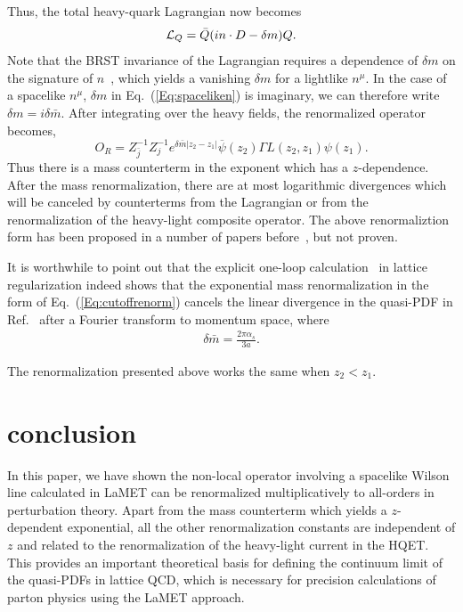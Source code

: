 \documentclass[prd,aps,twocolumn,preprintnumbers, showpacs, nofootinbib,superscriptaddress,notitlepage]{revtex4-1}
\newcommand{\beq}{\begin{eqnarray}}
\newcommand{\eeq}{\end{eqnarray}}
\begin{document}
Thus, the total heavy-quark Lagrangian now becomes
\begin{equation}\label{Eq:spaceliken}
    {\cal L}_Q = \bar Q (i n\cdot D-\delta m)Q.
\end{equation}
Note that the BRST invariance of the Lagrangian requires a dependence of $\delta m$ on the signature of $n$~\cite{Dorn:1986dt}, which yields a vanishing $\delta m$ for a lightlike $n^\mu$. In the case of a spacelike $n^\mu$, $\delta m$ in Eq.~(\ref{Eq:spaceliken}) is imaginary, we can therefore write $\delta m=i\delta {\bar m}$. After integrating over the heavy fields,  the renormalized operator becomes,
\begin{equation}\label{Eq:cutoffrenorm}
        O_R = Z_{\bar j}^{-1}Z_{j}^{-1}e^{\delta \bar m|z_2-z_1|}\overline{\psi}(z_2) \Gamma L(z_2,z_1)\psi(z_1).
\end{equation}
Thus there is a mass counterterm in the exponent which has a $z$-dependence.
After the mass renormalization, there are at most logarithmic divergences which will be canceled by counterterms from the Lagrangian or from the renormalization of the heavy-light composite operator. The above renormaliztion form has been proposed in a number of papers before~\cite{Musch:2010ka,Ishikawa:2016znu,Chen:2016fxx,Constantinou:2017sej,Alexandrou:2017huk,Chen:2017mzz},
but not proven.

It is worthwhile to point out that the explicit one-loop calculation~\cite{Chen:2016fxx} in lattice regularization indeed shows that the exponential mass renormalization in the form of Eq.~(\ref{Eq:cutoffrenorm}) cancels the linear divergence in the quasi-PDF in Ref.~\cite{Xiong:2013bka} after a Fourier transform to momentum space, where
\beq
\delta \bar m=\frac{2\pi\alpha_s }{3a}.
\eeq

The renormalization presented above works the same when $z_2<z_1$.

\section{conclusion}
In this paper, we have shown the non-local operator involving a spacelike Wilson line calculated in LaMET can be renormalized multiplicatively to all-orders in perturbation theory. Apart from the mass counterterm which yields
a $z$-dependent exponential, all the other renormalization constants are independent of $z$ and related to the renormalization
of the heavy-light current in the HQET. This provides an important theoretical basis for defining the
continuum limit of the quasi-PDFs in lattice QCD, which is necessary for precision calculations of parton physics
using the LaMET approach.
\end{document}

